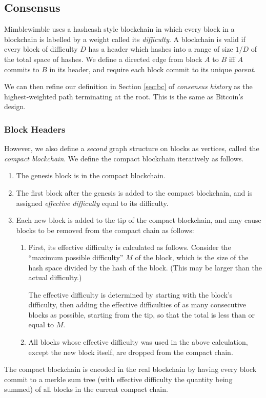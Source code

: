 \documentclass[letterpaper]{article}
\begin{document}
\subsection{Consensus\label{sec:consensus}}

Mimblewimble uses a hashcash\cite{back2002} style blockchain in which every
block in a blockchain is labelled by a weight called its \emph{difficulty}.
A blockchain is valid if every block of difficulty $D$ has a header which
hashes into a range of size $1/D$ of the total space of hashes. We define
a directed edge from block $A$ to $B$ iff $A$ commits to $B$ in its header,
and require each block commit to its unique \emph{parent}.

We can then refine our definition in Section \ref{sec:bc} of \emph{consensus
history} as the highest-weighted path terminating at the root. This is the
same as Bitcoin's design.

\subsubsection{Block Headers\label{sec:bhead}}

However, we also define a \emph{second} graph structure on blocks as
vertices, called the \emph{compact blockchain}. We define the compact
blockchain iteratively as follows.
\begin{enumerate}
\item The genesis block is in the compact blockchain.
\item The first block after the genesis is added to the compact blockchain,
and is assigned \emph{effective difficulty} equal to its difficulty.
\item Each new block is added to the tip of the compact blockchain, and may
cause blocks to be removed from the compact chain as follows: 
\begin{enumerate}
\item First, its effective difficulty is calculated as follows. Consider
the ``maximum possible difficulty'' $M$ of the block, which is the size
of the hash space divided by the hash of the block. (This may be larger
than the actual difficulty.)

The effective difficulty is determined by starting with the block's
difficulty, then adding the effective difficulties of as many
consecutive blocks as possible, starting from the tip, so that the total
is less than or equal to $M$.

\item All blocks whose effective difficulty was used in the above calculation,
except the new block itself, are dropped from the compact chain.
\end{enumerate}
\end{enumerate}
The compact blockchain is encoded in the real blockchain by having every
block commit to a merkle sum tree (with effective difficulty the quantity
being summed) of all blocks in the current compact chain. 
\end{document}
